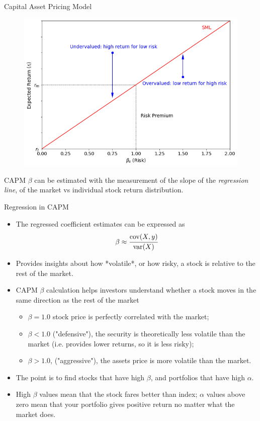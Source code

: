\documentclass{beamer}
\begin{document}
\begin{frame}{Capital Asset Pricing Model}
  \begin{figure}[h]
    \begin{center}
      \includegraphics[width=0.45\linewidth]{sml}
    \end{center}
  \end{figure}
  CAPM $\beta$ can be estimated with the measurement of the slope of the \emph{regression line}, of the market vs individual stock return distribution.
\end{frame}


\begin{frame}{Regression in CAPM}
  \begin{itemize}
  \item The regressed coefficient estimates can be expressed as
    \begin{equation*}
      \beta \approx \cfrac{\textrm{cov}(X,y)}{\textrm {var}(X)}
    \end{equation*}
  \item Provides insights about how *volatile*, or how risky, a stock is relative to the rest of the market.
  \item CAPM $\beta$ calculation helps investors understand whether a stock moves in the same direction as the rest of the market
    \begin{itemize}
      \item $\beta= 1.0$ stock price is perfectly correlated with the market;
      \item $\beta < 1.0$ ("defensive"), the security is theoretically less volatile than the market (i.e. provides lower returns, so it is less risky);
      \item $\beta > 1.0$, ("aggressive"), the assets price is more volatile than the market.
    \end{itemize}
  \item The point is to find stocks that have high $\beta$, and portfolios that have high $\alpha$. 
  \item High $\beta$ values mean that the stock fares better than index; $\alpha$ values above zero mean that your portfolio gives positive return no matter what the market does.
  \end{itemize}
\end{frame}
\end{document}
